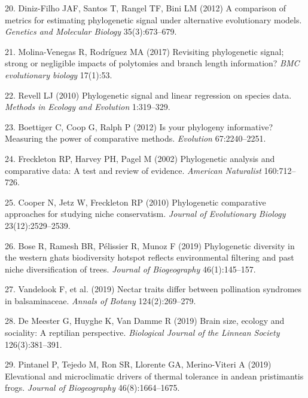 \documentclass[9pt,twocolumn,twoside,lineno]{pnas-new}
\begin{document}
\leavevmode\hypertarget{ref-DinizFilho2012}{}%
20. Diniz-Filho JAF, Santos T, Rangel TF, Bini LM (2012) A comparison of
metrics for estimating phylogenetic signal under alternative
evolutionary models. \emph{Genetics and Molecular Biology}
35(3):673--679.

\leavevmode\hypertarget{ref-MolinaVenegas2017}{}%
21. Molina-Venegas R, Rodríguez MA (2017) Revisiting phylogenetic
signal; strong or negligible impacts of polytomies and branch length
information? \emph{BMC evolutionary biology} 17(1):53.

\leavevmode\hypertarget{ref-Revell2010}{}%
22. Revell LJ (2010) Phylogenetic signal and linear regression on
species data. \emph{Methods in Ecology and Evolution} 1:319--329.

\leavevmode\hypertarget{ref-Boettiger_et_al2012}{}%
23. Boettiger C, Coop G, Ralph P (2012) Is your phylogeny informative?
Measuring the power of comparative methods. \emph{Evolution}
67:2240--2251.

\leavevmode\hypertarget{ref-Freckleton_et_al2002}{}%
24. Freckleton RP, Harvey PH, Pagel M (2002) Phylogenetic analysis and
comparative data: A test and review of evidence. \emph{American
Naturalist} 160:712--726.

\leavevmode\hypertarget{ref-Cooper2010}{}%
25. Cooper N, Jetz W, Freckleton RP (2010) Phylogenetic comparative
approaches for studying niche conservatism. \emph{Journal of
Evolutionary Biology} 23(12):2529--2539.

\leavevmode\hypertarget{ref-Bose2019}{}%
26. Bose R, Ramesh BR, Pélissier R, Munoz F (2019) Phylogenetic
diversity in the western ghats biodiversity hotspot reflects
environmental filtering and past niche diversification of trees.
\emph{Journal of Biogeography} 46(1):145--157.

\leavevmode\hypertarget{ref-Vandelook2019}{}%
27. Vandelook F, et al. (2019) Nectar traits differ between pollination
syndromes in balsaminaceae. \emph{Annals of Botany} 124(2):269--279.

\leavevmode\hypertarget{ref-DeMeester2019}{}%
28. De Meester G, Huyghe K, Van Damme R (2019) Brain size, ecology and
sociality: A reptilian perspective. \emph{Biological Journal of the
Linnean Society} 126(3):381--391.

\leavevmode\hypertarget{ref-Pintanel2019}{}%
29. Pintanel P, Tejedo M, Ron SR, Llorente GA, Merino-Viteri A (2019)
Elevational and microclimatic drivers of thermal tolerance in andean
pristimantis frogs. \emph{Journal of Biogeography} 46(8):1664--1675.
\end{document}
